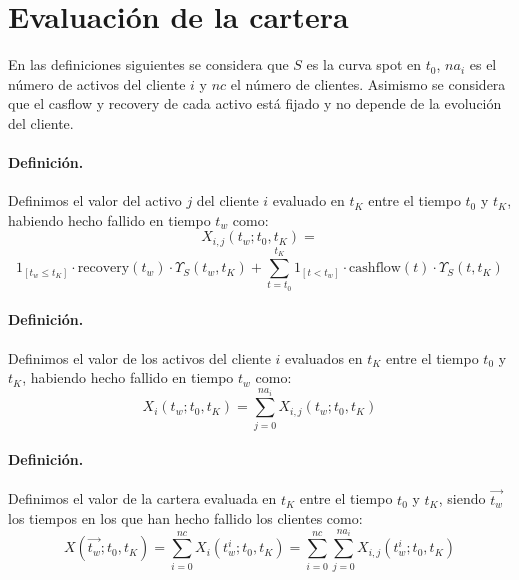 
\section{Evaluaci\'on de la cartera}

En las definiciones siguientes se considera que $S$ es la curva spot en $t_0$,
$na_i$ es el n\'umero de activos del cliente $i$ y $nc$ el n\'umero de clientes.
Asimismo se considera que el casflow y recovery de cada activo est\'a fijado y
no depende de la evoluci\'on del cliente.

\paragraph{Definici\'on.} Definimos el valor del activo $j$ del cliente $i$
evaluado en $t_K$ entre el tiempo $t_0$ y $t_K$, habiendo hecho fallido en
tiempo $t_w$ como:
\begin{equation}
X_{i,j}(t_w;t_0,t_K) = 
\end{equation}
\begin{displaymath}
\textrm{1}_{[t_w \leq t_K]} \cdot \textrm{recovery}(t_w) \cdot \Upsilon_S(t_w,t_K) +
\sum_{t=t_0}^{t_K} \textrm{1}_{[t < t_w]} \cdot \textrm{cashflow}(t) \cdot \Upsilon_S(t,t_K)
\end{displaymath}

\paragraph{Definici\'on.} Definimos el valor de los activos del cliente $i$
evaluados en $t_K$ entre el tiempo $t_0$ y $t_K$, habiendo hecho fallido en
tiempo $t_w$ como:
\begin{equation}
X_i(t_w;t_0,t_K) = \sum_{j=0}^{na_i} X_{i,j}(t_w;t_0,t_K)
\end{equation}

\paragraph{Definici\'on.} Definimos el valor de la cartera evaluada en $t_K$
entre el tiempo $t_0$ y $t_K$, siendo $\vec{t_w}$ los tiempos en los que han hecho
fallido los clientes como:
\begin{equation}
X(\vec{t_w};t_0,t_K) = \sum_{i=0}^{nc} X_i(t_w^i;t_0,t_K) =
\sum_{i=0}^{nc} \sum_{j=0}^{na_i} X_{i,j}(t_w^i;t_0,t_K)
\end{equation}

